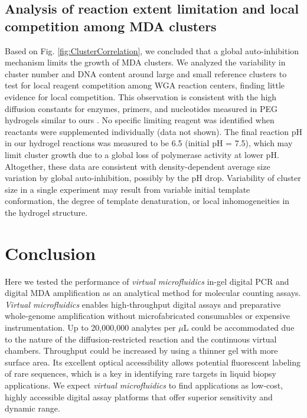 \subsection{Analysis of reaction extent limitation and local competition among MDA clusters}
Based on Fig. \ref{fig:ClusterCorrelation}, we concluded that a global auto-inhibition mechanism limits the growth of MDA clusters. We analyzed the variability in cluster number and DNA content around large and small reference clusters to test for local reagent competition among WGA reaction centers, finding little evidence for local competition. This observation is consistent with the high diffusion constants for enzymes, primers, and nucleotides measured in PEG hydrogels similar to ours \cite{Wu:2009ez,Weber:2009fe}. No specific limiting reagent was identified when reactants were supplemented individually (data not shown). The final reaction pH in our hydrogel reactions was measured to be 6.5 (initial pH = 7.5), which may limit cluster growth due to a global loss of polymerase activity at lower pH. Altogether, these data are consistent with density-dependent average size variation by global auto-inhibition, possibly by the pH drop. Variability of cluster size in a single experiment may result from variable initial template conformation, the degree of template denaturation, or local inhomogeneities in the hydrogel structure.

\section{Conclusion}
Here we tested the performance of \textit{virtual microfluidics} in-gel digital PCR and digital MDA amplification as an analytical method for molecular counting assays. \textit{Virtual microfluidics} enables high-throughput digital assays and preparative whole-genome amplification without microfabricated consumables or expensive instrumentation. Up to 20,000,000 analytes per $\mu$L could be accommodated due to the nature of the diffusion-restricted reaction and the continuous virtual chambers. Throughput could be increased by using a thinner gel with more surface area. Its excellent optical accessibility allows potential fluorescent labeling of rare sequences, which is a key in identifying rare targets in liquid biopsy applications. We expect \textit{virtual microfluidics} to find applications as low-cost, highly accessible digital assay platforms that offer superior sensitivity and dynamic range. 


